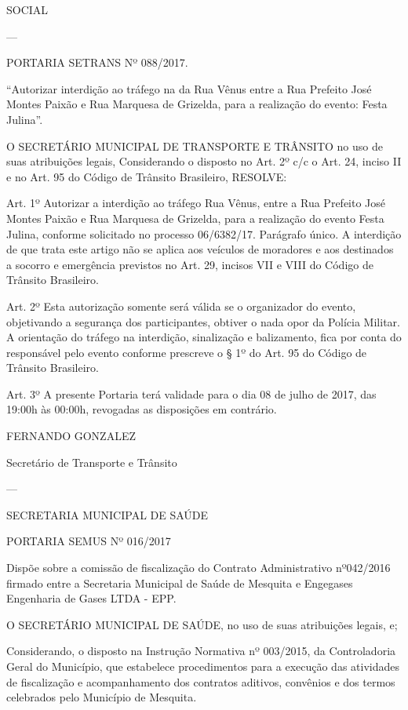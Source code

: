 \documentclass{doliberto}
\begin{document}
SOCIAL 

---

PORTARIA SETRANS Nº 088/2017. 

 

“Autorizar  interdição  ao  tráfego  na  da  Rua  Vênus  entre  a 
Rua  Prefeito  José  Montes  Paixão  e  Rua  Marquesa  de 
Grizelda, para a realização do evento: Festa Julina”. 
 
O  SECRETÁRIO  MUNICIPAL  DE  TRANSPORTE  E 
TRÂNSITO no uso de suas atribuições legais,  
Considerando o disposto no Art. 2º c/c o Art. 24, inciso II e 
no Art. 95 do Código de Trânsito Brasileiro,  
RESOLVE:  

 
Art. 1º Autorizar a interdição ao tráfego Rua Vênus, entre a  
Rua  Prefeito  José  Montes  Paixão  e  Rua  Marquesa  de 
Grizelda, para a realização do evento Festa Julina, conforme 
solicitado no processo 06/6382/17. 
Parágrafo único. A interdição de que trata este artigo não se 
aplica  aos  veículos  de  moradores  e  aos  destinados  a 
socorro e emergência previstos no Art. 29, incisos VII e VIII 
do Código de Trânsito Brasileiro.  
 
Art.  2º  Esta  autorização  somente  será  válida  se  o 
organizador  do  evento,  objetivando  a  segurança  dos 
participantes, obtiver o nada opor da Polícia Militar.  A 
orientação  do  tráfego  na  interdição,  sinalização  e 
balizamento, fica por conta do responsável pelo evento 
conforme  prescreve  o  §  1º  do  Art.  95  do  Código  de 
Trânsito Brasileiro.  
 
Art.  3º  A  presente  Portaria  terá  validade  para  o  dia  08  de 
julho  de  2017,  das  19:00h  às  00:00h,  revogadas  as 
disposições em contrário. 
 
 

FERNANDO GONZALEZ 

Secretário de Transporte e Trânsito 

---

SECRETARIA MUNICIPAL DE SAÚDE 

 

PORTARIA SEMUS Nº 016/2017 

  
Dispõe  sobre  a  comissão  de  fiscalização  do  Contrato 
Administrativo  nº042/2016  firmado  entre  a  Secretaria 
Municipal de Saúde de Mesquita e Engegases Engenharia de 
Gases LTDA - EPP. 
 
O  SECRETÁRIO  MUNICIPAL  DE  SAÚDE,  no  uso  de  suas 
atribuições legais, e; 
 
Considerando,  o  disposto  na  Instrução  Normativa  nº 
003/2015,  da  Controladoria  Geral  do  Município,  que 
estabelece  procedimentos  para  a  execução  das  atividades 
de  fiscalização  e  acompanhamento  dos  contratos  aditivos, 
convênios  e  dos  termos  celebrados  pelo  Município  de 
Mesquita. 
 
\end{document}
